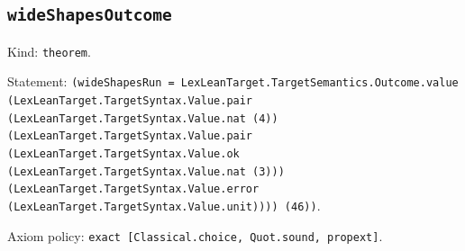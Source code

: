 \documentclass[11pt]{article}
\begin{document}
\subsection*{\texttt{wideShapesOutcome}}
\noindent Kind: \texttt{theorem}.\par
\noindent Statement: \texttt{(wideShapesRun = LexLeanTarget.TargetSemantics.Outcome.value (LexLeanTarget.TargetSyntax.Value.pair (LexLeanTarget.TargetSyntax.Value.nat (4)) (LexLeanTarget.TargetSyntax.Value.pair (LexLeanTarget.TargetSyntax.Value.ok (LexLeanTarget.TargetSyntax.Value.nat (3))) (LexLeanTarget.TargetSyntax.Value.error (LexLeanTarget.TargetSyntax.Value.unit)))) (46))}.\par
\noindent Axiom policy: \texttt{exact [Classical.choice, Quot.sound, propext]}.\par
\end{document}
